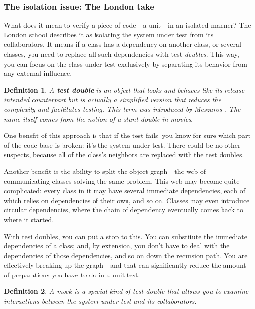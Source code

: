 \documentclass{article}
\newtheorem{definition}{Definition}
\begin{document}
\subsubsection{The isolation issue: The London take}

What does it mean to verify a piece of code—a unit—in an isolated manner? The London school describes it as isolating the system under test from its collaborators. It means if a class has a dependency on another class, or several classes, you need to replace all such dependencies with test \textit{doubles}. This way, you can focus on the class under test exclusively by separating its behavior from any external influence.

\begin{definition}
A \textbf{test double} is an object that looks and behaves like its release-intended counterpart but is actually a simplified version that reduces the complexity and facilitates testing. This term was introduced by Meszaros \cite{Meszaros07}. The name itself comes from the notion of a stunt double in movies.
\end{definition}

One benefit of this approach is that if the test fails, you know for sure which part of the code base is broken: it’s the system under test. There could be no other suspects, because all of the class’s neighbors are replaced with the test doubles.

Another benefit is the ability to split the object graph—the web of communicating classes solving the same problem. This web may become quite complicated: every class in it may have several immediate dependencies, each of which relies on dependencies of their own, and so on. Classes may even introduce circular dependencies, where the chain of dependency eventually comes back to where it started.

With test doubles, you can put a stop to this. You can substitute the immediate dependencies of a class; and, by extension, you don’t have to deal with the dependencies of those dependencies, and so on down the recursion path. You are effectively breaking up the graph—and that can significantly reduce the amount of preparations you have to do in a unit test.

\begin{definition}
A mock is a special kind of test double that allows you to examine interactions between the system under test and its collaborators.
\end{definition}
\end{document}
